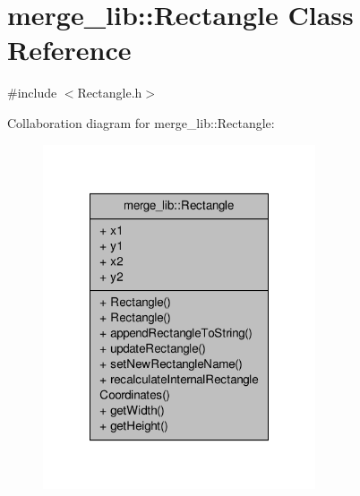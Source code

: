 \hypertarget{classmerge__lib_1_1_rectangle}{\section{merge\-\_\-lib\-:\-:Rectangle Class Reference}
\label{da/d60/classmerge__lib_1_1_rectangle}
}


{\ttfamily \#include $<$Rectangle.\-h$>$}



Collaboration diagram for merge\-\_\-lib\-:\-:Rectangle\-:
\nopagebreak
\begin{figure}[H]
\begin{center}
\leavevmode
\includegraphics[width=228pt]{d9/dc0/classmerge__lib_1_1_rectangle__coll__graph}
\end{center}
\end{figure}
